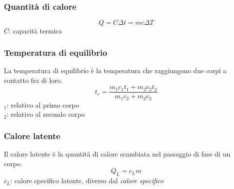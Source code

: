 \subsubsection{Quantità di calore}
\begin{equation*}
Q = C\Delta t = mc\Delta T
\end{equation*}
$C$: capacità termica

\subsubsection{Temperatura di equilibrio}
La temperatura di equilibrio è la temperatura che raggiungono due corpi a contatto fra di loro.
\begin{equation*}
t_e = \frac{m_1c_1t_1 + m_2c_2t_2}{m_1c_2 + m_2c_2}
\end{equation*}
$_1$: relativo al primo corpo\\
$_2$: relativo al secondo corpo

\subsubsection{Calore latente}
Il calore latente è la quantità di calore scambiata nel passaggio di fase di un corpo.
\begin{equation*}
Q_L = c_Lm
\end{equation*}
$c_L$: calore specifico latente, diverso dal \emph{calore specifico}

